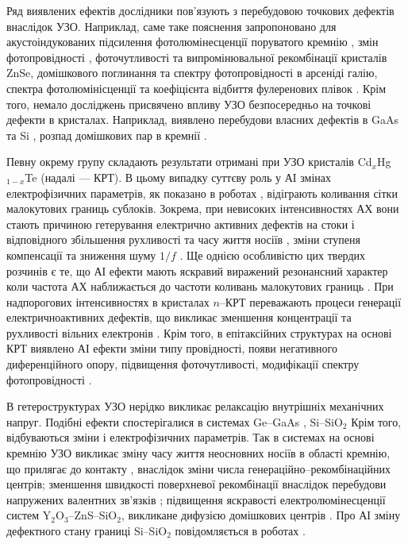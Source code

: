 Ряд виявлених ефектів дослідники пов'язують з перебудовою точкових дефектів внаслідок УЗО.
Наприклад, саме таке пояснення запропоновано для акустоіндукованих
підсилення фотолюмінесценції поруватого кремнію \cite{Bahar2003},
змін фотопровідності \cite{US:ZnSe},  фоточутливості та випромінювальної рекомбінації  \cite{ZobovFTP2008} кристалів ZnSe,
домішкового поглинання \cite{Zaver2007} та спектру фотопровідності \cite{UST:GaAs2015} в арсеніді галію,
спектра фотолюмінісценції та коефіцієнта відбиття фулеренових плівок \cite{RITTER2008}.
Крім того, немало досліджень присвячено впливу УЗО безпосередньо на точкові дефекти в кристалах.
Наприклад, виявлено перебудови  власних дефектів в GaAs \cite{Wosinski,Ostapenko1994,buyanova1994} та Si \cite{UST:Onanko},
розпад домішкових пар в кремнії \cite{Ostapenko1995SST,Ostapenko1995,Ostapenko1994APL}.


Певну окрему групу складають результати отримані при УЗО кристалів Cd$_x$Hg$_{1-x}$Te (надалі --- КРТ).
В цьому випадку суттєву роль у АІ змінах електрофізичних параметрів, як показано в роботах \cite{KRT:FTT89,KRT:FTT90}, відіграють коливання сітки малокутових границь сублоків.
Зокрема, при невисоких інтенсивностях АХ вони стають причиною гетерування електрично активних дефектів на стоки і відповідного збільшення рухливості та часу життя носіїв \cite{KRT:FTP90,Savkina:SPQEO2006}, зміни ступеня компенсації та зниження шуму $1/f$ \cite{Ol_Shav}.
Ще однією особливістю цих твердих розчинів є те, що АІ ефекти мають яскравий виражений резонансний характер коли частота АХ наближається до частоти коливань малокутових границь \cite{KRT:FTP90,KRT:FTT89,KRT:FTT90,Ol_Shav}.
При надпорогових інтенсивностях в кристалах $n$--КРТ переважають процеси генерації електричноактивних дефектів, що викликає зменшення концентрації та рухливості  вільних електронів \cite{KRT:FTP90,KRT:FTT89}.
Крім того, в епітаксійних структурах на основі КРТ виявлено АІ ефекти зміни типу провідності, появи негативного диференційного опору, підвищення фоточутливості, модифікації спектру фотопровідності \cite{Savkina:SST07,SavkinaPSSB2002}.


В гетероструктурах УЗО нерідко викликає релаксацію внутрішніх механічних напруг.
Подібні ефекти спостерігалися в системах Ge--GaAs \cite{BritunFTT,UST:GeGaAs1990}, Si--SiO$_2$ \cite{Zdeb1989}
Крім того, відбуваються зміни і електрофізичних параметрів.
Так в системах  на основі кремнію УЗО викликає зміну часу життя неосновних носіїв в області кремнію,
що прилягає до контакту \cite{Parchinskii2003r,Zdeb1989}, внаслідок зміни числа генераційно--рекомбінаційних центрів;
зменшення швидкості поверхневої рекомбінації внаслідок перебудови напружених валентних зв'язків \cite{Vlasov2009r,Parchinskii2003r};
підвищення яскравості електролюмінесценції систем Y$_2$O$_3$--ZnS--SiO$_2$, викликане дифузією домішкових центрів \cite{UST:ZnS}.
Про АІ зміну дефектного стану границі Si--SiO$_2$ повідомляється в роботах \cite{Ostap:SiO2,UST:Medvid}.


